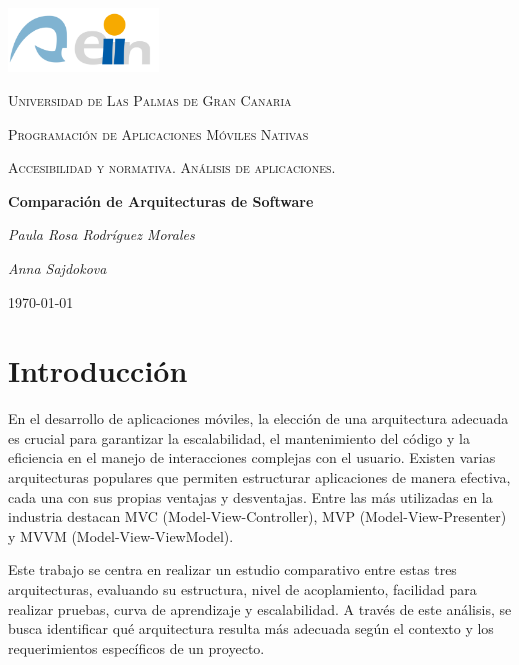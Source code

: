 \documentclass[letterpaper, 12pt]{report}
\begin{document}
\begin{titlepage}
	\centering
	\includegraphics[width=0.3\textwidth]{eii_ulpgc.png}\par\vspace{1cm}
	{\scshape\LARGE Universidad de Las Palmas de Gran Canaria \par}
	\vspace{1cm}
	{\scshape\Large Programación de Aplicaciones Móviles Nativas \par}
	\vspace{.2cm}
    {\scshape\Large Accesibilidad y normativa. Análisis de aplicaciones.\par}
	\vspace{1cm}
	{\Large\bfseries Comparación de Arquitecturas de Software \par}
	\vspace{1cm}
	{\itshape Paula Rosa Rodríguez Morales \par}
        {\itshape Anna Sajdokova \par}
	\vfill
	{\large \today\par}
\end{titlepage}

\tableofcontents
\newpage

\section{Introducción}
En el desarrollo de aplicaciones móviles, la elección de una arquitectura adecuada es crucial para garantizar la escalabilidad, el mantenimiento del código y la eficiencia en el manejo de interacciones complejas con el usuario. Existen varias arquitecturas populares que permiten estructurar aplicaciones de manera efectiva, cada una con sus propias ventajas y desventajas. Entre las más utilizadas en la industria destacan MVC (Model-View-Controller), MVP (Model-View-Presenter) y MVVM (Model-View-ViewModel).

Este trabajo se centra en realizar un estudio comparativo entre estas tres arquitecturas, evaluando su estructura, nivel de acoplamiento, facilidad para realizar pruebas, curva de aprendizaje y escalabilidad. A través de este análisis, se busca identificar qué arquitectura resulta más adecuada según el contexto y los requerimientos específicos de un proyecto.
\end{document}
